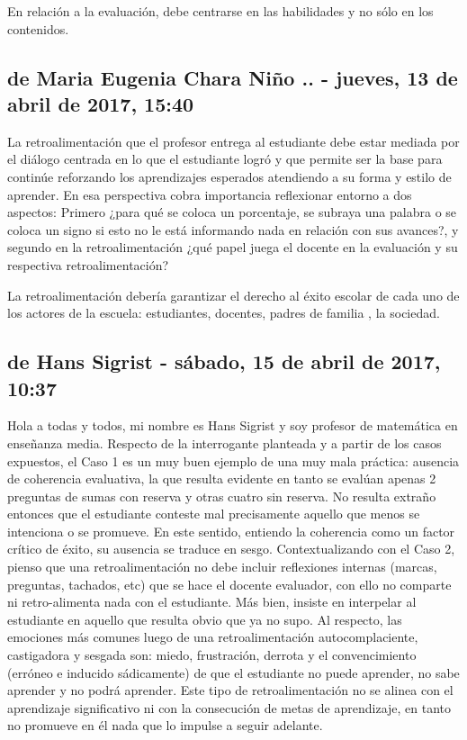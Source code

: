 \documentclass[12pt,letterpaper,article,x11names]{memoir}
\begin{document}
En relación a la evaluación, debe centrarse en las habilidades y no sólo en los contenidos.

\subsection{de Maria Eugenia Chara Niño .. - jueves, 13 de abril de 2017, 15:40}
\label{sec:orgf15f7e8}

La retroalimentación   que el profesor entrega al estudiante   debe estar   mediada por el diálogo centrada en lo que el estudiante logró y que permite ser la base para    continúe reforzando los aprendizajes esperados atendiendo a su forma   y estilo de aprender.  En esa   perspectiva cobra importancia reflexionar entorno a dos aspectos:  Primero ¿para qué se coloca un porcentaje, se subraya una palabra o se coloca un signo si esto no le está informando nada en relación con sus avances?, y segundo en la retroalimentación ¿qué papel juega el docente en la evaluación y su respectiva retroalimentación?

La retroalimentación debería garantizar el derecho   al éxito escolar   de  cada uno de los actores de la escuela: estudiantes, docentes, padres de familia , la sociedad.

\subsection{de Hans Sigrist - sábado, 15 de abril de 2017, 10:37}
\label{sec:orgd42c451}

Hola a todas y todos, mi nombre es Hans Sigrist y soy profesor de matemática en enseñanza media. Respecto de la interrogante planteada y a partir de los casos expuestos, el Caso 1 es un muy buen ejemplo de una muy mala práctica: ausencia de coherencia evaluativa, la que resulta evidente en tanto se evalúan apenas 2 preguntas de sumas con reserva y otras cuatro sin reserva. No resulta extraño entonces que el estudiante conteste mal precisamente aquello que menos se intenciona o se promueve. En este sentido, entiendo la coherencia como un factor crítico de éxito, su ausencia se traduce en sesgo. Contextualizando con el Caso 2, pienso que una retroalimentación no debe incluir reflexiones internas (marcas, preguntas, tachados, etc) que se hace el docente evaluador, con ello no comparte ni retro-alimenta nada con el estudiante. Más bien, insiste en interpelar al estudiante en aquello que resulta obvio que ya no supo. Al respecto, las emociones más comunes luego de una retroalimentación autocomplaciente, castigadora y sesgada son: miedo, frustración, derrota y el convencimiento (erróneo e inducido sádicamente) de que el estudiante no puede aprender, no sabe aprender y no podrá aprender. Este tipo de retroalimentación no se alinea con el aprendizaje significativo ni con la consecución de metas de aprendizaje, en tanto no promueve en él nada que lo impulse a seguir adelante. 
\end{document}

